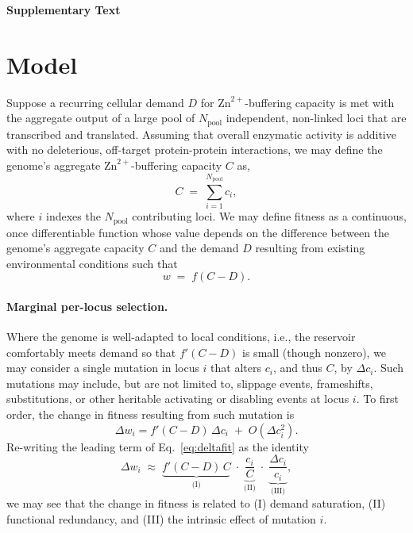 \documentclass[10pt]{article}
\newcommand{\Npool}{N_{\mathrm{pool}}}
\begin{document}
\begin{center}
{\Large\bfseries Supplementary Text}
\end{center}
\vspace{2pt}

\section{Model}
Suppose a recurring cellular demand $D$ for $\mathrm{Zn}^{2+}$-buffering capacity is met with the
aggregate output of a large pool of $\Npool$ independent, non-linked loci that are transcribed and translated. 
Assuming that overall enzymatic activity is additive with no deleterious, off-target protein-protein interactions,
we may define the genome's aggregate $\mathrm{Zn}^{2+}$-buffering capacity $C$ as,
\begin{equation}
C \;=\; \sum_{i=1}^{\Npool} c_i ,
\end{equation}
where $i$ indexes the $\Npool$ contributing loci. We may define fitness as a continuous, once differentiable function whose value
depends on the difference between the genome's aggregate capacity $C$ and the demand $D$ resulting 
from existing environmental conditions such that
\begin{equation}
w \;=\; f(C-D).
\label{eq:fitness}
\end{equation}

\paragraph{Marginal per-locus selection.} Where the genome is well-adapted to local conditions,
i.e., the reservoir comfortably meets demand so that $f'(C-D)$ is small (though nonzero), we may consider a single mutation 
in locus $i$ that alters $c_i$, and thus $C$, by $\Delta c_i$. Such mutations may include, but are not limited to, 
slippage events, frameshifts, substitutions, or other heritable activating or disabling events at locus $i$. 
To first order, the change in fitness resulting from such mutation is
\begin{equation}
\Delta w_i = f'(C-D)\,\Delta c_i \;+\; O(\Delta c_i^{2}).
\label{eq:deltafit}
\end{equation}
Re-writing the leading term of Eq.~\eqref{eq:deltafit} as the identity 
\begin{equation}
\Delta w_i \;\approx\;
\underbrace{f'(C-D)\,C}_{\text{(I)}}\;\cdot\;
\underbrace{\frac{c_i}{C}}_{\text{(II)}}\;\cdot\;
\underbrace{\frac{\Delta c_i}{c_i}}_{\text{(III)}} ,
\label{eq:star}
\end{equation}
we may see that the change in fitness is related to (I) demand saturation, (II) functional redundancy, and
(III) the intrinsic effect of mutation $i$.
\end{document}
